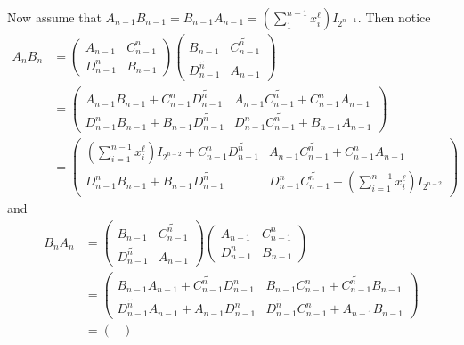 \documentclass [11pt, proquest] {uwthesis}[2020/02/24]
\begin{document}
\begin{prf}
        Now assume that $A_{n-1}B_{n-1}=B_{n-1}A_{n-1}=(\sum_1^{n-1}x_i^\ell)I_{2^{n-1}}.$ Then notice
        \begin{align*}
            A_nB_n&=\begin{pmatrix}A_{n-1} & C_{n-1}^n\\D_{n-1}^n& B_{n-1}\end{pmatrix}\begin{pmatrix}B_{n-1}&\widetilde{C_{n-1}^n}\\ \widetilde{D_{n-1}^n} & A_{n-1}\end{pmatrix}\\
            &=\begin{pmatrix}A_{n-1}B_{n-1}+C_{n-1}^n\widetilde{D_{n-1}^n} & A_{n-1}\widetilde{C_{n-1}^n}+C_{n-1}^nA_{n-1}\\
        D_{n-1}^nB_{n-1}+B_{n-1}\widetilde{D_{n-1}^n} & D_{n-1}^n\widetilde{C_{n-1}^n}+B_{n-1}A_{n-1}\end{pmatrix}\\
            &=\begin{pmatrix}(\sum_{i=1}^{n-1} x_i^\ell)I_{2^{n-2}}+C_{n-1}^n\widetilde{D_{n-1}^n} & A_{n-1}\widetilde{C_{n-1}^n}+C_{n-1}^nA_{n-1}\\
        D_{n-1}^nB_{n-1}+B_{n-1}\widetilde{D_{n-1}^n} & D_{n-1}^n\widetilde{C_{n-1}^n}+(\sum_{i=1}^{n-1} x_i^\ell)I_{2^{n-2}}\end{pmatrix}
        \end{align*}
        and
        \begin{align*}
            B_nA_n&=\begin{pmatrix}
                B_{n-1}&\widetilde{C_{n-1}^n}\\ \widetilde{D_{n-1}^n} & A_{n-1}
            \end{pmatrix}\begin{pmatrix}
                A_{n-1} & C_{n-1}^n\\D_{n-1}^n& B_{n-1}
            \end{pmatrix}\\
            &=\begin{pmatrix}
                B_{n-1}A_{n-1}+\widetilde{C_{n-1}^n}D_{n-1}^n & B_{n-1}C_{n-1}^n+\widetilde{C_{n-1}^n}B_{n-1}\\
                \widetilde{D_{n-1}^n}A_{n-1} + A_{n-1}D_{n-1}^n & \widetilde{D_{n-1}^n}C_{n-1}^n+ A_{n-1}B_{n-1}
            \end{pmatrix}\\
            &=\begin{pmatrix}

\end{pmatrix}
\end{align*}
\end{prf}
\end{document}
